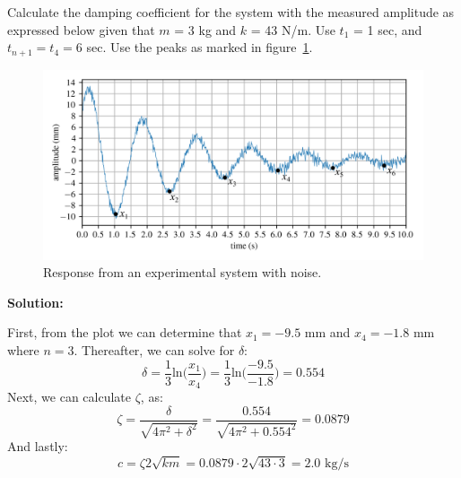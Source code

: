 \documentclass[12pt,letter]{article}
\begin{document}
\begin{example}
			
			Calculate the damping coefficient for the system with the measured amplitude as expressed below given that $m$ = 3 kg and $k$ = 43 N/m. Use $t_1$ = 1 sec, and $t_{n+1} =t_4=6$ sec. Use the peaks as marked in figure~\ref{fig:Logarithmic_decrement_with_noise}.

			\begin{figure}[H]
				\centering
				\includegraphics[width=1\linewidth]{../figures/Logarithmic_decrement_with_noise.png}
				\caption{Response from an experimental system with noise.}
				\label{fig:Logarithmic_decrement_with_noise}
			\end{figure}
			
			\noindent\textbf{Solution:} 
						
			First, from the plot we can determine that $x_1=-9.5$ mm and $x_4=-1.8$ mm where $n=3$. Thereafter, we can solve for $\delta$:  
			\begin{equation}
				\delta = \frac{1}{3}\text{ln}\bigg(\frac{x_{\text{1}}}{x_{\text{4}}}\bigg) = \frac{1}{3}\text{ln}\bigg(\frac{-9.5}{-1.8}\bigg) = 0.554
			\end{equation}						
			Next, we can calculate $\zeta$, as: 
			\begin{equation}
				\zeta = \frac{\delta}{\sqrt{4\pi^2+\delta^2}} = \frac{0.554}{\sqrt{4\pi^2+0.554^2}} = 0.0879
			\end{equation}
			And lastly:			
			\begin{equation}
				c = \zeta 2\sqrt{km} = 0.0879 \cdot 2\sqrt{43 \cdot 3} = 2.0 \text{ kg/s}
			\end{equation}	

\end{example}
\end{document}
